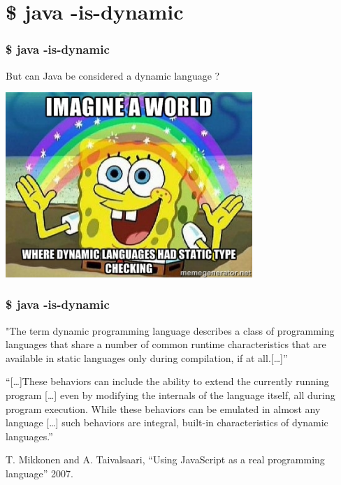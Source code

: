 
\section{\$ java -is-dynamic}

\begin{frame}
  \frametitle{\$ java -is-dynamic}

  But can Java be considered a dynamic language ? 
  \vspace{0.4cm}
  \begin{center}
  \includegraphics[width=0.7\textwidth]{fig/dynlang}    
  \end{center}
\end{frame}

\begin{frame}
  \frametitle{\$ java -is-dynamic}
  \center

  "The term dynamic programming language describes a class of programming languages that share a number of common runtime characteristics that are available in static languages only during compilation, if at all.[…]” 

  \vspace{0.3cm}

  “[…]These behaviors can include the ability to extend the currently running program […] even by modifying the internals of the language itself, all during program execution. While these behaviors can be emulated in almost any language […] such behaviors are integral, built-in characteristics of dynamic languages.”
  \vspace{0.3cm}

T. Mikkonen and A. Taivalsaari,
“Using JavaScript as a real programming language” 2007.

\end{frame}

